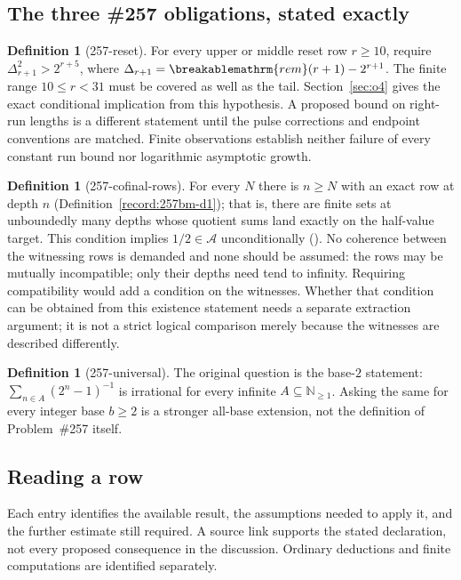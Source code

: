 \documentclass[11pt]{article}
\theoremstyle{plain}
\theoremstyle{definition}
\newtheorem{defn}[thm]{Definition}
\theoremstyle{remark}
\newcommand{\lean}[2]{\leanlink{#2}}
\renewcommand{\mathrm}[1]{\ifmmode\breakablemathrm{#1}\else\textrm{#1}\fi}%
\begin{document}
\subsection{The three \#257 obligations, stated exactly}

\begin{defn}[257-reset]
For every upper or middle reset row $r\ge10$, require
$\Delta_{r+1}^2>2^{r+5}$, where
$\Delta_{r+1}=\mathrm{rem}(r+1)-2^{r+1}$.
The finite range $10\le r<31$ must be covered as well as the tail.
Section~\ref{sec:o4} gives the exact conditional implication from this
hypothesis.  A proposed bound on right-run lengths is a different
statement until the pulse corrections and endpoint conventions are
matched.  Finite observations establish neither failure of every
constant run bound nor logarithmic asymptotic growth.
\end{defn}

\begin{defn}[257-cofinal-rows]
For every $N$ there is $n\ge N$ with an exact row at depth $n$
(Definition~\ref{record:257bm-d1}); that is, there are finite sets at unboundedly many depths
whose quotient sums land exactly on the half-value target.  This condition implies
$1/2\in\mathcal A$ unconditionally
(\lean{half\_mem\_mersenneAchievementSet\_of\_cofinalExactLocalRows}{BooleanMobiusCofinalExactRows.lean:71}).
No coherence between the witnessing rows is demanded and none should be assumed: the rows may
be mutually incompatible; only their depths need tend to infinity. Requiring compatibility would add a condition on the witnesses.
Whether that condition can be obtained from this existence statement
needs a separate extraction argument; it is not a strict logical
comparison merely because the witnesses are described differently.
\end{defn}

\begin{defn}[257-universal]
The original question is the base-$2$ statement:
$\sum_{n\in A}(2^n-1)^{-1}$ is irrational for every infinite
$A\subseteq\mathbb N_{\ge1}$.  Asking the same for every integer
base $b\ge2$ is a stronger all-base extension, not the definition of
Problem~\#257 itself.
\end{defn}

\subsection{Reading a row}

Each entry identifies the available result, the assumptions needed to
apply it, and the further estimate still required.  A source link supports
the stated declaration, not every proposed consequence in the discussion.
Ordinary deductions and finite computations are identified separately.
\end{document}
